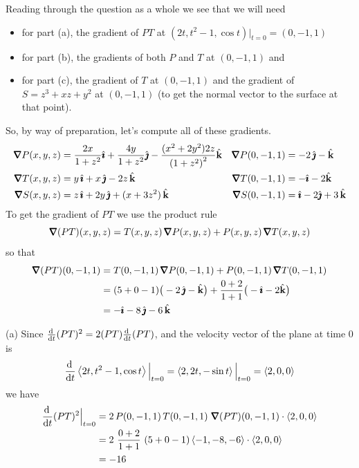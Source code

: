 \begin{solution}
Reading through the question as a whole we see that we will need
\begin{itemize}
\item 
for part (a), the gradient of $PT$ at $(2t, t^2 - 1, \cos t)\Big|_{t=0}
                                        =(0,-1,1)$
\item
for part (b), the gradients of both $P$ and $T$ at $(0,-1,1)$ and
\item
for part (c), the gradient of $T$ at $(0,-1,1)$ and the gradient of
$S=z^3+xz+y^2$ at $(0,-1,1)$ (to get the normal vector to the surface
at that point).
\end{itemize}
So, by way of preparation, let's compute all of these gradients.
\begin{align*}
\vnabla P(x,y,z) &= \frac{2x}{1+z^2}\hi + \frac{4y}{1+z^2}\hj 
                          -\frac{(x^2+2y^2)2z}{{(1+z^2)}^2}\hk  &
\vnabla P(0,-1,1) &=  -2\,\hj  - \hk 
\\
\vnabla T(x,y,z) &= y\,\hi + x\,\hj -2z\,\hk  &
\vnabla T(0,-1,1) &=  -\hi  - 2\hk 
\\
\vnabla S(x,y,z) &= z\,\hi + 2y\,\hj +(x+3z^2)\,\hk  &
\vnabla S(0,-1,1) &= \hi  - 2\hj +3\,\hk 
\end{align*}
To get the gradient of $PT$ we use the product rule
\begin{equation*}
\vnabla(PT)(x,y,z) =T(x,y,z)\,\vnabla P(x,y,z) +P(x,y,z)\,\vnabla T(x,y,z)
\end{equation*}
so that
\begin{align*}
\vnabla(PT)(0,-1,1) 
  &=T(0,-1,1)\,\vnabla P(0,-1,1) +P(0,-1,1)\,\vnabla T(0,-1,1) \\
  &=(5+0-1) \big(-2\,\hj  - \hk\big) + \frac{0+2}{1+1}\big(-\hi  - 2\hk\big) \\
  &= -\hi -8\,\hj -6\,\hk
\end{align*}

(a) Since $\diff{}{t}(PT)^2 = 2(PT)\diff{}{t}(PT)$, and the velocity vector of
the plane at time $0$ is
\begin{equation*}
\diff{}{t}\llt 2t, t^2 - 1, \cos t\rgt\Big|_{t=0}
=\llt 2, 2t, -\sin t\rgt\Big|_{t=0}
=\llt 2,0,0\rgt
\end{equation*}
we have
\begin{align*}
\diff{}{t}(PT)^2\Big|_{t=0} 
&= 2\,P(0,-1,1)\,T(0,-1,1)\ \vnabla(PT)(0,-1,1)\cdot \llt 2,0,0\rgt \\
&= 2\ \frac{0+2}{1+1}\ (5+0-1)\llt -1,-8,-6\rgt \cdot \llt 2,0,0\rgt \\
&= -16
\end{align*}


\end{solution}
